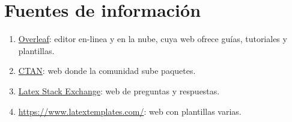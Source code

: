 \chapter{Fuentes de información}
\begin{enumerate}
	\item \href{https://es.overleaf.com/learn}{Overleaf}: editor en-linea y en la nube, cuya web ofrece guías, tutoriales y plantillas.
	\item \href{https://www.ctan.org/}{CTAN}: web donde la comunidad sube paquetes.
	\item \href{https://tex.stackexchange.com}{Latex Stack Exchange}: web de preguntas y respuestas.
	\item \url{https://www.latextemplates.com/}: web con plantillas varias.
\end{enumerate}